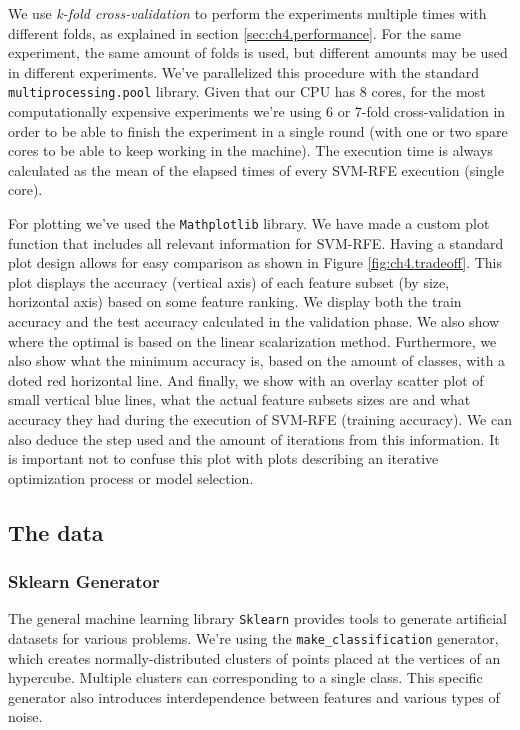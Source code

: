 We use \emph{k-fold cross-validation} to perform the experiments multiple times with different folds, as explained in section \ref{sec:ch4.performance}. For the same experiment, the same amount of folds is used, but different amounts may be used in different experiments. We've parallelized this procedure with the standard \texttt{multiprocessing.pool} library. Given that our CPU has 8 cores, for the most computationally expensive experiments we're using 6 or 7-fold cross-validation in order to be able to finish the experiment in a single round (with one or two spare cores to be able to keep working in the machine). The execution time is always calculated as the mean of the elapsed times of every SVM-RFE execution (single core).

For plotting we've used the \texttt{Mathplotlib} library. We have made a custom plot function that includes all relevant information for SVM-RFE. Having a standard plot design allows for easy comparison as shown in Figure \ref{fig:ch4.tradeoff}. This plot displays the accuracy (vertical axis) of each feature subset (by size, horizontal axis) based on some feature ranking. We display both the train accuracy and the test accuracy calculated in the validation phase. We also show where the optimal is based on the linear scalarization method. Furthermore, we also show what the minimum accuracy is, based on the amount of classes, with a doted red horizontal line. And finally, we show with an overlay scatter plot of small vertical blue lines, what the actual feature subsets sizes are and what accuracy they had during the execution of SVM-RFE (training accuracy). We can also deduce the step used and the amount of iterations from this information. It is important not to confuse this plot with plots describing an iterative optimization process or model selection.

\subsection{The data}

\subsubsection*{Sklearn Generator}

The general machine learning library \texttt{Sklearn} provides tools to generate artificial datasets for various prob\-lems. We're using the \texttt{make\_classification} gen\-er\-a\-tor, which creates normally-distributed clus\-ters of points placed at the vertices of an hypercube. Multiple clusters can corresponding to a single class. This specific gen\-er\-a\-tor also introduces in\-ter\-de\-pen\-dence between features and var\-i\-ous types of noise.

